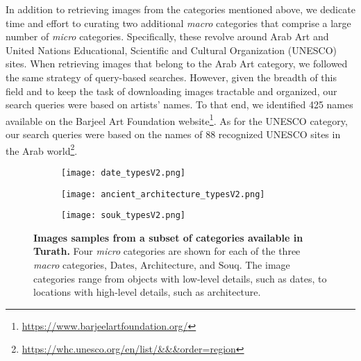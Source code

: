 \documentclass{article}
\begin{document}
In addition to retrieving images from the categories mentioned above, we dedicate time and effort to curating two additional \textit{macro} categories that comprise a large number of \textit{micro} categories. Specifically, these revolve around Arab Art and United Nations Educational, Scientific and Cultural Organization (UNESCO) sites. When retrieving images that belong to the Arab Art category, we followed the same strategy of query-based searches. However, given the breadth of this field and to keep the task of downloading images tractable and organized, our search queries were based on artists' names. To that end, we identified 425 names available on the Barjeel Art Foundation website\footnote{\url{https://www.barjeelartfoundation.org/}}. As for the UNESCO category, our search queries were based on the names of 88 recognized UNESCO sites in the Arab world\footnote{\url{https://whc.unesco.org/en/list/&&&order=region}}. 

\begin{figure}[!t]
    \centering
    \begin{subfigure}{0.32\textwidth}
        \centering
        \texttt{[image: date\_typesV2.png]}
    \end{subfigure}
    \hfill
    \begin{subfigure}{0.32\textwidth}
        \centering
        \texttt{[image: ancient\_architecture\_typesV2.png]}
    \end{subfigure}
    \hfill
    \begin{subfigure}{0.32\textwidth}
        \centering
        \texttt{[image: souk\_typesV2.png]}
    \end{subfigure}
    \caption{\textbf{Images samples from a subset of categories available in Turath.} Four \textit{micro} categories are shown for each of the three \textit{macro} categories, $\mathrm{Dates}$, $\mathrm{Architecture}$, and $\mathrm{Souq}$. The image categories range from objects with low-level details, such as dates, to locations with high-level details, such as architecture.}
    \label{fig:images}
\end{figure}
\end{document}
